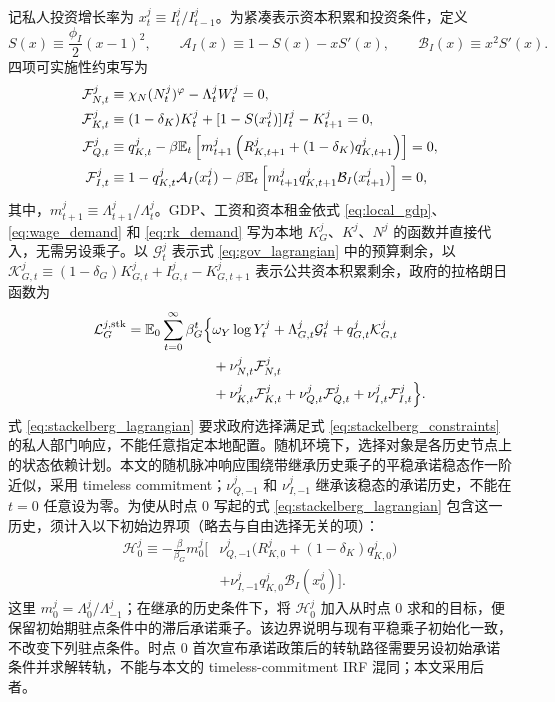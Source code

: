 \documentclass[12pt,UTF8]{ctexart}
\newcommand{\E}{\mathbb{E}}
\begin{document}
	记私人投资增长率为 $x_t^j\equiv I_t^j/I_{t-1}^j$。为紧凑表示资本积累和投资条件，定义
	\begin{equation}
		S(x)\equiv\frac{\phi_I}{2}(x-1)^2,\qquad
		\mathcal A_I(x)\equiv1-S(x)-xS'(x),\qquad
		\mathcal B_I(x)\equiv x^2S'(x).
		\label{eq:stackelberg_investment_auxiliary}
	\end{equation}
	四项可实施性约束写为
	\begin{align}
		\mathcal F_{N,t}^j
		&\equiv\chi_N(N_{t}^j)^{\varphi}-\Lambda_{t}^jW_t^j=0, \notag\\
		\mathcal F_{K,t}^j
		&\equiv(1-\delta_K)K_t^j+[1-S(x_t^j)]I_t^j-K_{t+1}^j=0, \notag\\
		\mathcal F_{Q,t}^j
		&\equiv q_{K,t}^j-\beta \E_t\left[
		m_{t+1}^j\left(R_{K,t+1}^j+(1-\delta_K)q_{K,t+1}^j\right)
		\right]=0, \notag\\
		\mathcal F_{I,t}^j
		&\equiv1-q_{K,t}^j\mathcal A_I(x_t^j)
		-\beta \E_t\left[m_{t+1}^j q_{K,t+1}^j\mathcal B_I(x_{t+1}^j)\right]=0,
		\label{eq:stackelberg_constraints}
	\end{align}
	其中，$m_{t+1}^j\equiv\Lambda_{t+1}^j/\Lambda_{t}^j$。GDP、工资和资本租金依式 \eqref{eq:local_gdp}、\eqref{eq:wage_demand} 和 \eqref{eq:rk_demand} 写为本地 $K_G^j$、$K^j$、$N^j$ 的函数并直接代入，无需另设乘子。以 $\mathcal G_t^j$ 表示式 \eqref{eq:gov_lagrangian} 中的预算剩余，以 $\mathcal K_{G,t}^j\equiv(1-\delta_G)K_{G,t}^j+I_{G,t}^j-K_{G,t+1}^j$ 表示公共资本积累剩余，政府的拉格朗日函数为
	\begin{align}
		\mathcal L_G^{j,\mathrm{stk}}
		=\E_0\sum_{t=0}^{\infty}\beta_G^t\Big\{
		&\omega_Y\log Y_t^j
		+\Lambda_{G,t}^j\mathcal G_t^j
		+q_{G,t}^j\mathcal K_{G,t}^j \notag\\
		&+\nu_{N,t}^j\mathcal F_{N,t}^j \notag\\
		&+\nu_{K,t}^j\mathcal F_{K,t}^j
		+\nu_{Q,t}^j\mathcal F_{Q,t}^j
		+\nu_{I,t}^j\mathcal F_{I,t}^j
		\Big\}.
		\label{eq:stackelberg_lagrangian}
	\end{align}
	式 \eqref{eq:stackelberg_lagrangian} 要求政府选择满足式 \eqref{eq:stackelberg_constraints} 的私人部门响应，不能任意指定本地配置。随机环境下，选择对象是各历史节点上的状态依赖计划。本文的随机脉冲响应围绕带继承历史乘子的平稳承诺稳态作一阶近似，采用 timeless commitment；$\nu_{Q,-1}^j$ 和 $\nu_{I,-1}^j$ 继承该稳态的承诺历史，不能在 $t=0$ 任意设为零。为使从时点 0 写起的式 \eqref{eq:stackelberg_lagrangian} 包含这一历史，须计入以下初始边界项（略去与自由选择无关的项）：
	\begin{equation}
		\begin{split}
		\mathcal H_0^j\equiv-\frac{\beta}{\beta_G}m_0^j\Big[&
		\nu_{Q,-1}^j\big(R_{K,0}^j+(1-\delta_K)q_{K,0}^j\big)\\
		&+\nu_{I,-1}^j q_{K,0}^j\mathcal B_I(x_0^j)\Big].
		\end{split}
		\label{eq:stackelberg_inherited_boundary}
	\end{equation}
	这里 $m_0^j=\Lambda_0^j/\Lambda_{-1}^j$；在继承的历史条件下，将 $\mathcal H_0^j$ 加入从时点 0 求和的目标，便保留初始期驻点条件中的滞后承诺乘子。该边界说明与现有平稳乘子初始化一致，不改变下列驻点条件。时点 0 首次宣布承诺政策后的转轨路径需要另设初始承诺条件并求解转轨，不能与本文的 timeless-commitment IRF 混同；本文采用后者。
	
\end{document}
